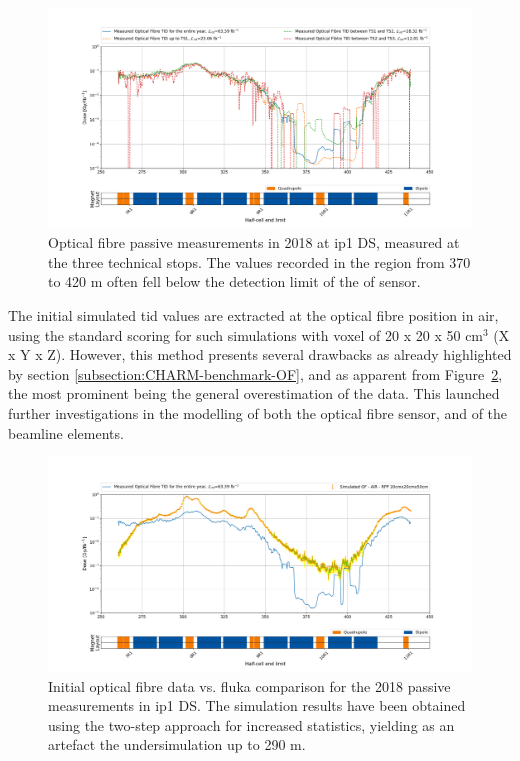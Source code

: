 \documentclass[encoding=utf8,british]{tumphthesis}
\begin{document}
\begin{figure}[H]
    \centering
    \includegraphics[width=1.0\linewidth]{results/measured_OF_data_250_450.png}
    \caption{Optical fibre passive measurements in 2018 at \acrshort{ip}1 DS, measured at the three technical stops. The values recorded in the region from 370 to 420 m often fell below the detection limit of the  \acrshort{of} sensor.}
    \label{fig:LHC-OF-measured-data}
\end{figure}


The initial simulated \acrshort{tid} values are extracted at the optical fibre position in air, using the standard scoring for such simulations with voxel of 20 x 20 x 50 cm$^3$ (X x Y x Z). However, this method presents several drawbacks as already highlighted by section \ref{subsection:CHARM-benchmark-OF}, and as apparent from Figure~\ref{fig:LHC-benchmark-OF-initial}, the most prominent being the general overestimation of the data. This launched further investigations in the modelling of both the optical fibre sensor, and of the beamline elements.

\begin{figure}[H]
    \centering
    \includegraphics[width=1.0\linewidth]{results/OF_measured_vs_standard_scoring.png}
    \caption{Initial optical fibre data vs. \acrshort{fluka} comparison for the 2018 passive measurements in \acrshort{ip}1 DS. The simulation results have been obtained using the two-step approach for increased statistics, yielding as an artefact the undersimulation up to 290 m.}
    \label{fig:LHC-benchmark-OF-initial}
\end{figure}
\end{document}
